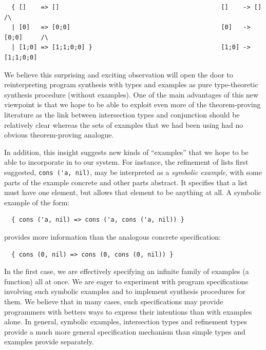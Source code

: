 \noindent
{\small
\begin{lstlisting}
  { []    => []                                            []    -> []        /\
  | [0]   => [0;0]                                         [0]   -> [0;0]     /\
  | [1;0] => [1;1;0;0] }                                   [1;0] -> [1;1;0;0] 
\end{lstlisting}
}
\noindent
We believe this surprising and exciting observation will open the door
to reinterpreting program synthesis with types and examples as pure
type-theoretic synthesis procedure (without examples).  One of the main
advantages of this new viewpoint is that we hope to be able to exploit
even more of the theorem-proving literature as the link between intersection
types and conjunction should be relatively 
clear whereas the sets of examples that we had been using had no obvious
theorem-proving analogue.  

In addition, this insight suggests new kinds
of ``examples'' that we hope to be able to incorporate in to our system.
For instance, the refinement of lists first suggested, \verb+cons ('a, nil)+, 
may be interpreted as a \emph{symbolic example}, with some parts of the
example concrete and other parts abstract.  It specifies that a list 
must have one element, but allows that element to be anything at all.
A symbolic example of the form:

\noindent
{\small
\begin{lstlisting}
  { cons ('a, nil) => cons ('a, cons ('a, nil)) }
\end{lstlisting}
}

\noindent
provides more information than the analogous concrete specification:

\noindent
{\small
\begin{lstlisting}
  { cons (0, nil) => cons (0, cons (0, nil)) }
\end{lstlisting}
}

\noindent
In the first case, we are effectively specifying an infinite family of
examples (a function) all at once.
We are eager to experiment with program specifications involving such
symbolic examples and to implement synthesis procedures for them.
We believe that in many cases,
such specifications may provide programmers with
betters ways to express their intentions than with examples alone.
In general, symbolic examples, intersection types and refinement
types provide a much more general specification mechanism than
simple types and examples provide separately.


